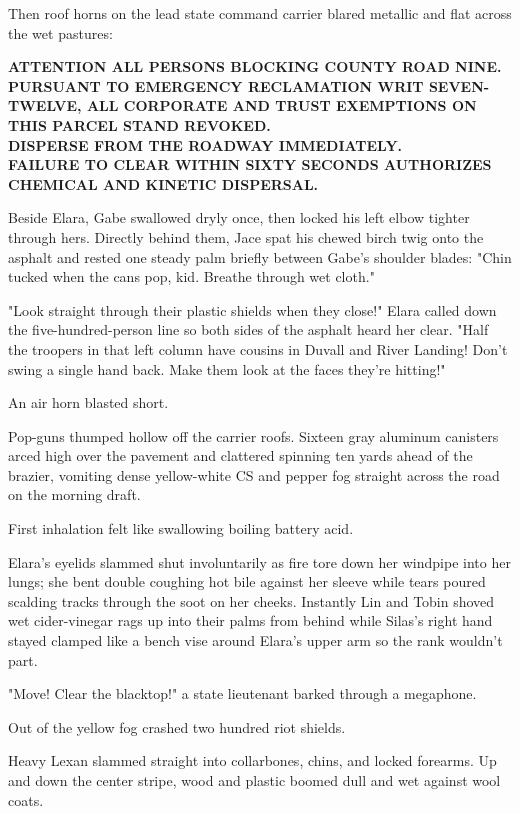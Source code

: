 Then roof horns on the lead state command carrier blared metallic and flat across the wet pastures:

\begin{center}
\textbf{ATTENTION ALL PERSONS BLOCKING COUNTY ROAD NINE.}\\
\textbf{PURSUANT TO EMERGENCY RECLAMATION WRIT SEVEN-TWELVE, ALL CORPORATE AND TRUST EXEMPTIONS ON THIS PARCEL STAND REVOKED.}\\
\textbf{DISPERSE FROM THE ROADWAY IMMEDIATELY.}\\
\textbf{FAILURE TO CLEAR WITHIN SIXTY SECONDS AUTHORIZES CHEMICAL AND KINETIC DISPERSAL.}
\end{center}

Beside Elara, Gabe swallowed dryly once, then locked his left elbow tighter through hers. Directly behind them, Jace spat his chewed birch twig onto the asphalt and rested one steady palm briefly between Gabe's shoulder blades: "Chin tucked when the cans pop, kid. Breathe through wet cloth."

"Look straight through their plastic shields when they close!" Elara called down the five-hundred-person line so both sides of the asphalt heard her clear. "Half the troopers in that left column have cousins in Duvall and River Landing! Don't swing a single hand back. Make them look at the faces they're hitting!"

An air horn blasted short.

Pop-guns thumped hollow off the carrier roofs. Sixteen gray aluminum canisters arced high over the pavement and clattered spinning ten yards ahead of the brazier, vomiting dense yellow-white CS and pepper fog straight across the road on the morning draft.

First inhalation felt like swallowing boiling battery acid.

Elara's eyelids slammed shut involuntarily as fire tore down her windpipe into her lungs; she bent double coughing hot bile against her sleeve while tears poured scalding tracks through the soot on her cheeks. Instantly Lin and Tobin shoved wet cider-vinegar rags up into their palms from behind while Silas's right hand stayed clamped like a bench vise around Elara's upper arm so the rank wouldn't part.

"Move! Clear the blacktop!" a state lieutenant barked through a megaphone.

Out of the yellow fog crashed two hundred riot shields.

Heavy Lexan slammed straight into collarbones, chins, and locked forearms. Up and down the center stripe, wood and plastic boomed dull and wet against wool coats.

